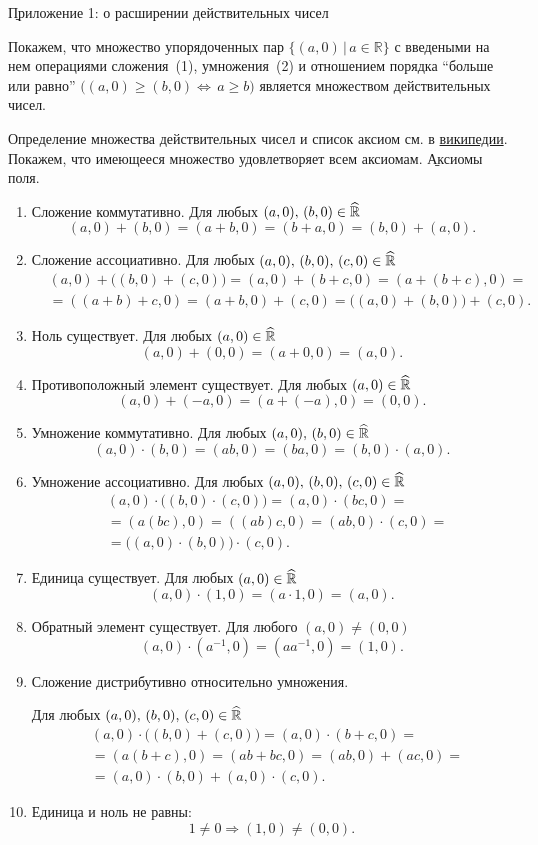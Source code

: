 \begin{center}
	\b{Приложение 1: о расширении действительных чисел}
\end{center}

Покажем, что множество упорядоченных пар $\{(a, 0)\,|\,a\in\mathbb{R}\}$ с введеными на нем операциями сложения~(1), умножения~(2) и отношением порядка ``больше или равно'' $\big((a, 0)\ge (b, 0)\Leftrightarrow\,a\ge b\big)$ является множеством действительных чисел.\par
Определение множества действительных чисел и список аксиом см. в \href{https://ru.wikipedia.org/wiki/%D0%92%D0%B5%D1%89%D0%B5%D1%81%D1%82%D0%B2%D0%B5%D0%BD%D0%BD%D0%BE%D0%B5_%D1%87%D0%B8%D1%81%D0%BB%D0%BE}{википедии}. Покажем, что имеющееся множество удовлетворяет всем аксиомам.
\b{Аксиомы поля}.
\begin{enumerate}
	\item Сложение коммутативно. Для любых $(a, 0),\,(b, 0)\in\widehat{\mathbb{R}}$
		$$(a, 0)+(b, 0)=(a+b, 0)=(b+a, 0)=(b, 0)+(a, 0).$$
	\item Сложение ассоциативно. Для любых $(a, 0),\,(b, 0),\,(c, 0)\in\widehat{\mathbb{R}}$
		\begin{eqnarray*}
		& (a, 0)+\big((b, 0)+(c, 0)\big)=(a, 0)+(b+c, 0)=(a+(b+c), 0)=\\
		& =((a+b)+c, 0)=(a+b, 0)+(c, 0)=\big((a, 0)+(b, 0)\big)+(c, 0).
		\end{eqnarray*}
	\item Ноль существует. Для любых $(a, 0)\in\widehat{\mathbb{R}}$
		$$(a, 0)+(0, 0)=(a+0, 0)=(a, 0).$$
	\item Противоположный элемент существует. Для любых $(a, 0)\in\widehat{\mathbb{R}}$
		$$(a, 0)+(-a, 0)=(a+(-a), 0)=(0, 0).$$
	\item Умножение коммутативно. Для любых $(a, 0),\,(b, 0)\in\widehat{\mathbb{R}}$
		$$(a, 0)\cdot(b, 0)=(ab, 0)=(ba, 0)=(b, 0)\cdot(a, 0).$$
	\item Умножение ассоциативно. Для любых $(a, 0),\,(b, 0),\,(c, 0)\in\widehat{\mathbb{R}}$
		\begin{eqnarray*}
			& (a, 0)\cdot\big((b, 0)\cdot(c, 0)\big)=(a, 0)\cdot(bc, 0)=\\
			& =(a(bc), 0)=((ab)c, 0)=(ab, 0)\cdot(c, 0)=\\
			& =\big((a, 0)\cdot(b, 0)\big)\cdot(c, 0).
		\end{eqnarray*}
	\item Единица существует. Для любых $(a, 0)\in\widehat{\mathbb{R}}$
		$$(a, 0)\cdot(1, 0)=(a\cdot 1, 0)=(a, 0).$$
	\item  Обратный элемент существует. Для любого $(a, 0)\neq (0, 0)$
		$$ (a, 0)\cdot(a^{-1}, 0)=(aa^{-1}, 0)=(1, 0).$$
	\item Сложение дистрибутивно относительно умножения.\par
	Для любых $(a, 0),\,(b, 0),\,(c, 0)\in\widehat{\mathbb{R}}$
		\begin{eqnarray*}
			& (a, 0)\cdot\big((b, 0)+(c, 0)\big)=(a, 0)\cdot(b+c, 0)=\\
			& =(a(b+c), 0)=(ab+bc, 0)=(ab, 0)+(ac, 0)=\\
			& =(a, 0)\cdot(b, 0)+(a, 0)\cdot(c, 0).
		\end{eqnarray*}
	\item Единица и ноль не равны:
		$$1\neq 0 \Rightarrow (1, 0)\neq(0, 0).$$
\end{enumerate}
